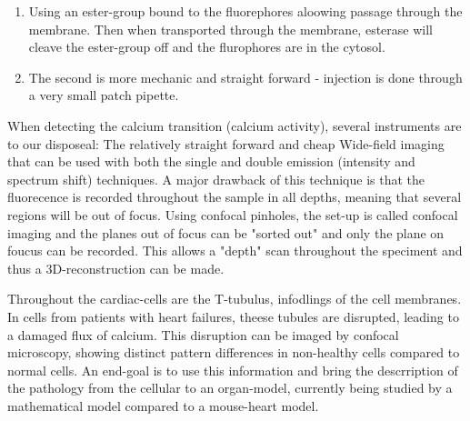 \documentclass[12p]{article}
\begin{document}
\begin{enumerate}
\item
Using an ester-group bound to the fluorephores aloowing passage through the membrane.
Then when transported through the membrane, esterase will cleave the ester-group off and the flurophores are in the cytosol.
\item
The second is more mechanic and straight forward - injection is done through a very small patch pipette.
\end{enumerate}

When detecting the calcium transition (calcium activity), several instruments are to our disposeal: 
The relatively straight forward and cheap Wide-field imaging that can be used with both the single and double emission (intensity and spectrum shift) techniques. 
A major drawback of this technique is that the fluorecence is recorded throughout the sample in all depths, meaning that several regions will be out of focus.
Using confocal pinholes, the set-up is called confocal imaging and the planes out of focus can be "sorted out" and only the plane on foucus can be recorded.
This allows a "depth" scan throughout the speciment and thus a 3D-reconstruction can be made.

Throughout the cardiac-cells are the T-tubulus, infodlings of the cell membranes.
In cells from patients with heart failures, theese tubules are disrupted, leading to a damaged flux of calcium.
This disruption can be imaged by confocal microscopy, showing distinct pattern differences in non-healthy cells compared to normal cells.
An end-goal is to use this information and bring the descrription of the pathology from the cellular to an organ-model, currently being studied by a mathematical model compared to a mouse-heart model.
\end{document}

